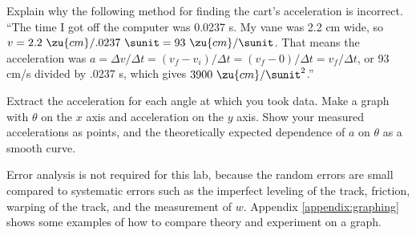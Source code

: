 \prelabquestion  Explain why the following method for finding the cart's
acceleration is incorrect.  ``The time I got off the
computer was 0.0237 s.  My vane was 2.2 cm wide, so
$v=2.2\ \zu{cm}/.0237\ \sunit=93\ \zu{cm}/\sunit$.  That means the acceleration
was $a=\Delta v/\Delta t=(v_f-v_i)/\Delta t=(v_f-0)/\Delta t=v_f/\Delta t$, or
93 cm/s divided by .0237 s, which gives $3900\ \zu{cm}/\sunit^2$.''

\analysis

Extract the acceleration for each angle at which you took
data.  Make a graph with $\theta $ on the $x$ axis and
acceleration on the $y$ axis.  Show your measured accelerations
as points, and the theoretically expected dependence of $a$
on $\theta $ as a smooth curve.

Error analysis is not required for this lab, because the
random errors are small compared to systematic errors such
as the imperfect leveling of the track, friction,
warping of the track, and the measurement of $w$.
Appendix \ref{appendix:graphing} shows some examples of how
to compare theory and experiment on a graph.
